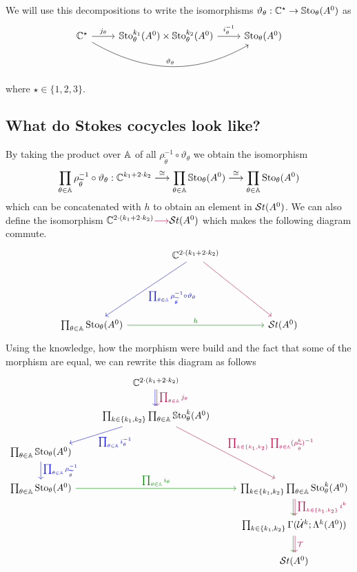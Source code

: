 We will use this decompositions to write the isomorphisms
$\vartheta_\theta:\mathbb{C}^\star\to \operatorname{\mathbb{S}to}_\theta(A^0)$ as
\[ \begin{tikzcd}
  \C^\star
  \rar{j_\theta}
  \arrow[rr,out=-30,in=-150,"\vartheta_\theta"]
  &
  \SSto_\theta^{k_1}(A^0)\times\SSto_\theta^{k_2}(A^0)
  \rar{i_\theta^{-1}}
  &
  \SSto_\theta(A^0)
\end{tikzcd} \]
where $\star\in\{1,2,3\}$.

\subsection{What do Stokes cocycles look like?}
\begin{prop}\label{prop:decompositionDiagram}
  By taking the product over $\mathbb{A}$ of all
  $\rho_{\tilde\theta}^{-1}\circ\vartheta_\theta$ we obtain the isomorphism
  \[
    \prod_{\theta\in\mathbb{A}}\rho_{\widetilde\theta}^{-1}\circ\vartheta_\theta:
    \mathbb{C}^{k_1+2\cdot k_2}
    \overset\cong\longrightarrow \prod_{\theta\in\mathbb{A}}\operatorname{\mathbb{S}to}_\theta(A^0)
    \overset\cong\longrightarrow \prod_{\theta\in\mathbb{A}}\operatorname{Sto}_\theta(A^0)
  \]
  which can be concatenated with $h$ to obtain an element in $\mathcal{S}{}t(A^0)$.
  We can also define the isomorphism
  $\mathbb{C}^{2\cdot(k_1+2\cdot k_2)}\textcolor{purple}{\longrightarrow} \mathcal{S}{}t(A^0)$
  which makes the following diagram commute.
  \[ \begin{tikzcd}[column sep=1.5cm,row sep=2cm]
      &\C^{2\cdot(k_1+2\cdot k_2)}
      \dlar[blue]{\prod_{\theta\in\A}\rho_{\tilde\theta}^{-1}\circ\vartheta_\theta}
      \arrow[dr,purple]
    \\\prod_{\theta\in\A}\Sto_\theta(A^0)
      \arrow[rr,green!50!black,"h"]
      &&\St(A^0)
  \end{tikzcd} \]
  Using the knowledge, how the morphism were build and the fact that some of
  the morphism are equal, we can rewrite this diagram as follows
  \[ \begin{tikzcd}
      &\C^{2\cdot(k_1+2\cdot k_2)}
      \dar[xshift=-1pt,blue]
      \dar[xshift=1pt,purple,"\prod_{\theta\in\A}j_\theta"]
    \\
      &\prod_{k\in\{k_1,k_2\}}\prod_{\theta\in\A}\SSto_{\theta}^{k}(A^0)
       \arrow[dl,blue,"\prod_{\theta\in\A}i_\theta^{-1}"]
       \arrow[ddr,purple,
         "\prod_{k\in\{k_1,k_2\}}\prod_{\theta\in\A}(\rho_{\tilde\theta}^k)^{-1}"]
    \\ \prod_{\theta\in\A} \SSto_{\theta}(A^0)
        \dar[blue]{\prod_{\theta\in\A}\rho_{\tilde\theta}^{-1}}
    \\\prod_{\theta\in\A} \Sto_{\theta}(A^0)
      \arrow[rr,green!50!black,"\prod_{\theta\in\A}i_\theta"]
      &&\prod_{k\in\{k_1,k_2\}}\prod_{\theta\in\A}\Sto_{\theta}^{k}(A^0)
      \dar[xshift=-1pt,green!50!black]
      \dar[xshift=1pt,purple]{\prod_{k\in\{k_1,k_2\}}i^k}
    \\
      && \prod_{k\in\{k_1,k_2\}}\Gamma(\dot\cU^k;\Lambda^k(A^0))
      \dar[xshift=-1pt,green!50!black]
      \dar[xshift=1pt,purple]{\cT}
    \\&& \St(A^0)
  \end{tikzcd} \]
\end{prop}

